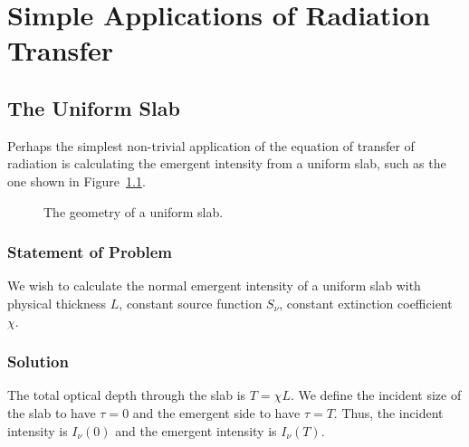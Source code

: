 
\chapter{Simple Applications of Radiation Transfer}

\section{The Uniform Slab}
\label{section:uniform-slab}

Perhaps the simplest non-trivial application of the equation of transfer of radiation is calculating the emergent intensity from a uniform slab, such as the one shown in Figure~\ref{fig-uniform-slab}.

\begin{figure}[b]
\begin{center}
\end{center}
\caption{The geometry of a uniform slab.}
\label{fig-uniform-slab}
\end{figure}

\newslide

\subsection{Statement of Problem}

We wish to calculate the normal emergent intensity of a uniform slab with physical thickness $L$, constant source function $S_\nu$, constant extinction coefficient $\chi$.

\subsection{Solution}

The total optical depth through the slab is $T=\chi L$. We define the incident size of the slab to have $\tau = 0$ and the emergent side to have $\tau = T$. Thus, the incident intensity is $I_\nu(0)$ and the emergent intensity is $I_\nu(T)$.

